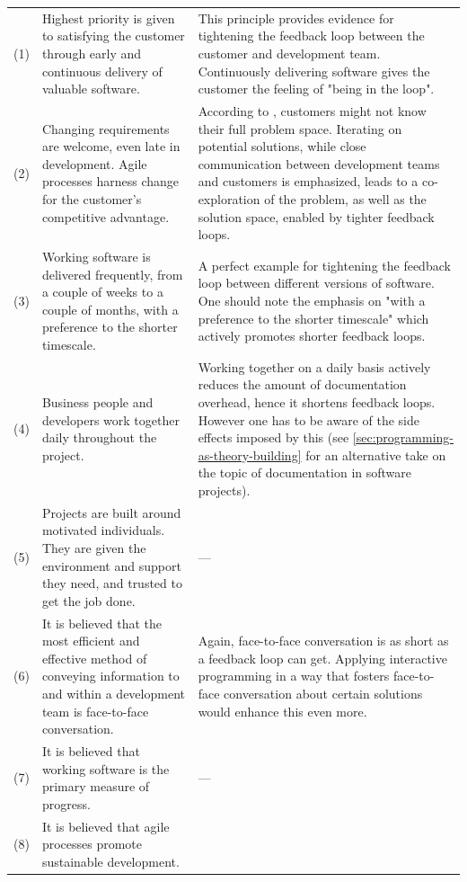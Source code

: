 \begin{block}
\begin{ThreePartTable}
\begin{longtable}{@{}cp{}p{}@{}}
    (1) &
    Highest priority is given to satisfying the customer through early and continuous delivery of valuable software. &
    This principle provides evidence for tightening the feedback loop between the customer and development team.
    Continuously delivering software gives the customer the feeling of "being in the loop".
    \\
    (2) &
    Changing requirements are welcome, even late in development. Agile processes harness change for the customer’s competitive advantage. &
    According to \cite{van_der_aalst_historical_2008}, customers might not know their full problem space.
    Iterating on potential solutions, while close communication between development teams and customers is emphasized, leads to a co-exploration of the problem, as well as the solution space, enabled by tighter feedback loops.
    \\
    (3) &
    Working software is delivered frequently, from a couple of weeks to a couple of months, with a preference to the shorter timescale. &
    A perfect example for tightening the feedback loop between different versions of software.
    One should note the emphasis on "with a preference to the shorter timescale" which actively promotes shorter feedback loops.
    \\
    (4) &
    Business people and developers work together daily throughout the project. &
    Working together on a daily basis actively reduces the amount of documentation overhead, hence it shortens feedback loops.
    However one has to be aware of the side effects imposed by this (see \ref{sec:programming-as-theory-building} for an alternative take on the topic of documentation in software projects).
    \\
    (5) &
    Projects are built around motivated individuals.
    They are given the environment and support they need, and trusted to get the job done. &
    ---
    \\
    (6) &
    It is believed that the most efficient and effective method of conveying information to and within a development team is face-to-face conversation. &
    Again, face-to-face conversation is as short as a feedback loop can get.
    Applying interactive programming in a way that fosters face-to-face conversation about certain solutions would enhance this even more.
    \\
    (7) &
    It is believed that working software is the primary measure of progress.&
    ---
    \\
    (8) &
    It is believed that agile processes promote sustainable development.

\end{longtable}
\end{ThreePartTable}
\end{block}
